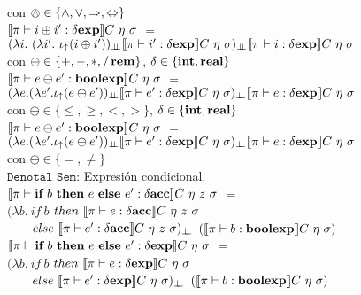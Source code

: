 con $\owedge \in \{ \wedge,\vee,\Rightarrow,\Leftrightarrow \}$\\

$\llbracket  \pi \vdash i \oplus i' : \delta \textbf{exp}  \rrbracket C \ \eta \ \sigma$ 
$=$ \\
\indent \indent \indent
$(\lambda i . \ (\lambda i' . \ \iota_{\uparrow} (i \oplus i'))_{\bot \!\!\! \bot}
\llbracket \pi \vdash i' : \delta \textbf{exp} \rrbracket C \ \eta \ \sigma)_{\bot \!\!\! \bot}
\llbracket \pi \vdash i : \delta \textbf{exp} \rrbracket C \ \eta \ \sigma$\\

con $\oplus \in \{ +,-,*,/\,\textbf{rem} \}$, $\delta \in \{\textbf{int},\textbf{real}\}$\\

$\llbracket  \pi \vdash e \ominus e' : \textbf{boolexp}  \rrbracket C \ \eta \ \sigma$ 
$=$ \\
\indent \indent \indent 
$(\lambda e . (\lambda e' . \iota_{\uparrow} (e \ominus e'))_{\bot \!\!\! \bot}
\llbracket \pi \vdash e' : \delta \textbf{exp} \rrbracket C \ \eta \ \sigma)_{\bot \!\!\! \bot}
\llbracket \pi \vdash e : \delta \textbf{exp} \rrbracket C \ \eta \ \sigma$\\

con $\ominus \in \{\leq,\geq,<,> \}$, $\delta \in \{\textbf{int},\textbf{real}\}$\\

$\llbracket  \pi \vdash e \ominus e' : \textbf{boolexp}  \rrbracket C \ \eta \ \sigma$ 
$=$ \\
\indent \indent \indent 
$(\lambda e . (\lambda e' . \iota_{\uparrow} (e \ominus e'))_{\bot \!\!\! \bot}
\llbracket \pi \vdash e' : \delta \textbf{exp} \rrbracket C \ \eta \ \sigma)_{\bot \!\!\! \bot}
\llbracket \pi \vdash e : \delta \textbf{exp} \rrbracket C \ \eta \ \sigma$\\

con $\ominus \in \{=,\neq\}$\\

\noindent
$\texttt{Denotal Sem:}$ Expresi\'on condicional.\\

$\llbracket  \pi \vdash \textbf{if} \ b \ \textbf{then} \ e \ \textbf{else} \ e': \delta \textbf{acc} \rrbracket C \ \eta \ z \ \sigma$ 
$=$ \\
\indent \indent \indent 
$(\lambda b . \ if \ b $ $then \ \llbracket  \pi \vdash e : \delta \textbf{acc} \rrbracket C \ \eta \ z \ \sigma$\\
\indent \indent \indent \indent \indent \ \ \ \
$else \ \llbracket  \pi \vdash e' : \delta \textbf{acc} \rrbracket C \ \eta \ z \ \sigma)_{\bot \!\!\! \bot}$ 
$(\semBrcks{ \pi \vdash b : \boolexp}C \ \eta \ \sigma)$\\

$\llbracket  \pi \vdash \textbf{if} \ b \ \textbf{then} \ e \ \textbf{else} \ e': \delta \textbf{exp} \rrbracket C \ \eta \ \sigma$ 
$=$ \\
\indent \indent \indent 
$(\lambda b . \ if \ b $ $then \ \llbracket  \pi \vdash e : \delta \textbf{exp} \rrbracket C \ \eta \ \sigma$\\
\indent \indent \indent \indent \indent \ \ \ \
$else \ \llbracket  \pi \vdash e' : \delta \textbf{exp} \rrbracket C \ \eta \ \sigma)_{\bot \!\!\! \bot}$ 
$(\semBrcks{ \pi \vdash b : \boolexp}C \ \eta \ \sigma)$\\

